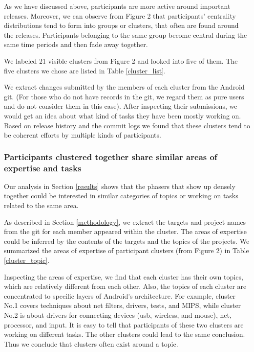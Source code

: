 \documentclass[conference]{IEEEtran}
\begin{document}
As we have discussed above, participants are more active around
important releases. Moreover, we can observe from Figure 2 that
participants' centrality distributions tend to form into groups or
clusters, that often
are found around the releases.
Participants belonging to the same group become central during
the same time periods and then fade away together.

We labeled 21 visible clusters from Figure 2 and looked into five of them. 
The five clusters we chose are listed in Table \ref{cluster_list}.

We extract changes submitted by the members of each cluster from the
Android git. (For those who do not have records in
the git, we regard them as pure users and do not
consider them in this case). After inspecting their submissions, we
would get an idea about what kind of tasks they have been mostly
working on.  
Based on release history and the commit logs we found 
that these clusters tend to be coherent efforts by multiple kinds of participants.




\subsubsection{Participants clustered together share similar areas of expertise and tasks}

Our analysis in Section \ref{results} shows that the phasers that show
up densely together could be interested in similar categories of
topics or working on tasks related to the same area.


As described in Section \ref{methodology}, we extract the targets and
project names from the git for each member appeared
within the cluster. The areas of expertise could be inferred by the contents
of the targets and the topics of the projects. We summarized the
areas of expertise of participant clusters (from Figure 2)
 in Table \ref{cluster_topic}.



Inspecting the areas of expertise, we find that each cluster has their own
topics, which are relatively different from each other. Also, the topics of
each cluster are concentrated to specific layers of Android's architecture.
For example, cluster No.1 covers techniques about net filters,
drivers, tests, and MIPS, while cluster No.2 is about drivers for
connecting devices (usb, wireless, and mouse), net, processor, and
input. 
It is easy to tell that participants of these two clusters are
working on different tasks. 
The other clusters could lead to the same
conclusion. 
Thus we conclude that clusters often exist around a topic.
\end{document}
